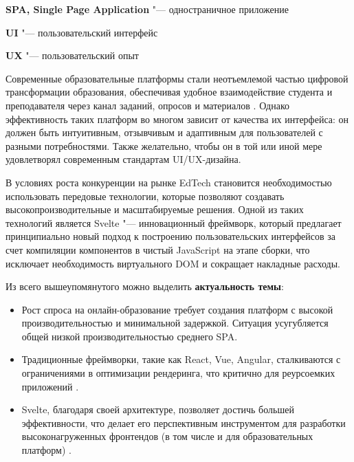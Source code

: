 \documentclass[bachelor, och, coursework]{SCWorks}
\begin{document}

\date{2025}

\maketitle

\secNumbering

\tableofcontents

\begin{description}
  \item \textbf{SPA, Single Page Application} "--- одностраничное приложение
  \item \textbf{UI} "--- пользовательский интерфейс
  \item \textbf{UX} "--- пользовательский опыт
\end{description}

\intro

Современные образовательные платформы стали неотъемлемой частью цифровой трансформации образования, обеспечивая удобное взаимодействие студента и преподавателя через канал заданий, опросов и материалов \cite{intro_digital_transformation}. Однако эффективность таких платформ во многом зависит от качества их интерфейса: он должен быть интуитивным, отзывчивым и адаптивным для пользователей с разными потребностями. Также желательно, чтобы он в той или иной мере удовлетворял современным стандартам UI/UX-дизайна.

В условиях роста конкуренции на рынке EdTech становится необходимостью использовать передовые технологии, которые позволяют создавать высокопроизводительные и масштабируемые решения. Одной из таких технологий является Svelte "--- инновационный фреймворк, который предлагает принципиально новый подход к построению пользовательских интерфейсов за счет компиляции компонентов в чистый JavaScript на этапе сборки, что исключает необходимость виртуального DOM и сокращает накладные расходы.

Из всего вышеупомянутого можно выделить \textbf{актуальность темы}:

\begin{itemize}
  \item Рост спроса на онлайн-образование требует создания платформ с высокой производительностью и минимальной задержкой. Ситуация усугубляется общей низкой производительностью среднего SPA.
  \item Традиционные фреймворки, такие как React, Vue, Angular, сталкиваются с ограничениями в оптимизации рендеринга, что критично для реурсоемких приложений \cite{intro_compare_frameworks}.
  \item Svelte, благодаря своей архитектуре, позволяет достичь большей эффективности, что делает его перспективным инструментом для разработки высоконагруженных фронтендов (в том числе и для образовательных платформ) \cite{intro_svelte_docs}.
\end{itemize}
\end{document}
